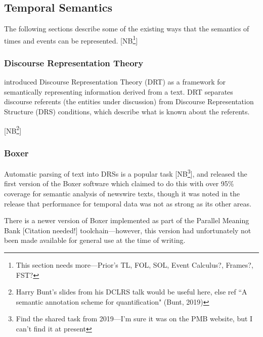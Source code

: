 \documentclass[a4paper,12pt,leqno]{article}
\newcommand{\citeneeded}[1][]{{\color{red}[Citation needed!#1]}}
\newcommand{\selfnote}[1]{{\color{red}[NB\footnote{{\color{red}#1}}]}}
\begin{document}
\subsection{Temporal Semantics}\label{sub:semantics}
The following sections describe some of the existing ways that the semantics of times and events can be represented. \selfnote{This section needs more---Prior's TL, FOL, SOL, Event Calculus?, Frames?, FST?}
\subsubsection{Discourse Representation Theory}\label{ssub:drt}
\citet{Kamp1993} introduced Discourse Representation Theory (DRT) as a framework for semantically representing information derived from a text. DRT separates discourse referents (the entities under discussion) from Discourse Representation Structure (DRS) conditions, which describe what is known about the referents.

\selfnote{Harry Bunt's slides from his DCLRS talk would be useful here, else ref ``A semantic annotation scheme for quantiﬁcation" (Bunt, 2019)}
\subsubsection{Boxer}\label{ssub:boxer}
Automatic parsing of text into DRSs is a popular task \selfnote{Find the shared task from 2019---I'm sure it was on the PMB website, but I can't find it at present}, and \citet{Bos2008} released the first version of the Boxer software which claimed to do this with over 95\% coverage for semantic analysis of newswire texts, though it was noted in the release that performance for temporal data was not as strong as its other areas.

There is a newer version of Boxer implemented as part of the Parallel Meaning Bank \citeneeded{} toolchain---however, this version had unfortunately not been made available for general use at the time of writing.

\newpage
\end{document}
